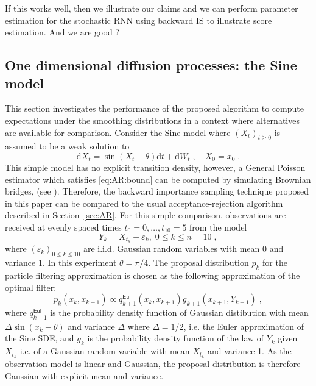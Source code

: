 \documentclass{article}
\newcommand{\rmd}{\ensuremath{\mathrm{d}}}
\newcommand{\eqsp}{\;}
\begin{document}
If this works well, then we illustrate our claims and we can perform parameter estimation for the stochastic RNN using backward IS to illustrate score estimation. And we are good ?

\subsection{One dimensional diffusion processes: the Sine model}
\label{sec:simu:SINE}
This section investigates the performance of the proposed algorithm to compute  expectations under the smoothing distributions in a context where  alternatives are available for comparison. Consider the Sine model where $(X_t)_{t\geqslant 0}$ is assumed to be a weak solution to
$$
\rmd X_t = \sin(X_t-\theta)\rmd t + \rmd W_t\eqsp,\quad X_0 = x_0\eqsp.
$$
This simple model has no explicit transition density, however, a General Poisson estimator which satisfies \eqref{eq:AR:bound} can be computed by simulating Brownian bridges, (see \cite{beskos2006exact}). 
Therefore, the backward importance sampling technique proposed in this paper can be compared to the usual acceptance-rejection algorithm described in Section~\ref{sec:AR}. 
For this simple comparison, observations are received at evenly spaced times $t_0=0,\ldots, t_{10} = 5$ from the model
\begin{equation}
\label{eq:obs:model:SINE}
Y_k=X_{t_k}+\varepsilon_k,\eqsp 0\leqslant k \leqslant n = 10\eqsp,
\end{equation}
where $(\varepsilon_k)_{0 \leqslant k\leqslant 10}$ are i.i.d. Gaussian random variables with mean $0$ and variance $1$. In this experiment $\theta = \pi/4$. 
The proposal distribution $p_k$ for the particle filtering approximation is chosen as the following approximation of the optimal filter:
\begin{equation}
\label{eq:optimal:filter}
p_{k}(x_{k},x_{k+1})\!\propto\! q^{\mathsf{Eul}}_{k+1}(x_{k},x_{k+1})g_{k+1}(x_{k+1},Y_{k+1})\eqsp,
\end{equation}
where $q^{\mathsf{Eul}}_{k+1}$ is the probability density function of Gaussian distibution with mean $\Delta \sin(x_k-\theta)$ and variance $\Delta$ where $\Delta = 1/2$, i.e. the Euler approximation of the Sine SDE, and $g_k$ is the probability density function of the law of $Y_k$ given $X_{t_k}$ i.e. of a Gaussian random variable with mean $X_{t_k}$ and variance 1. 
As the observation model is linear and Gaussian, the proposal distribution is therefore Gaussian with explicit mean and variance. 
\end{document}
